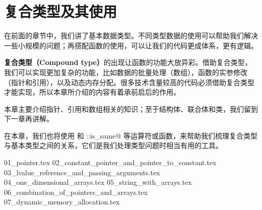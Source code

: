 \chapter{复合类型及其使用}
在前面的章节中，我们讲了基本数据类型。不同类型数据的使用可以帮助我们解决一些小规模的问题；再搭配函数的使用，可以让我们的代码更成体系，更有逻辑。\par
\textbf{复合类型（Compound type）}的出现让函数的功能大放异彩。借助复合类型，我们可以实现更加复杂的功能，比如数据的批量处理（数组），函数的实参修改（指针和引用），以及动态内存分配。很多技术含量较高的代码必须借助复合类型才能实现，所以本章所介绍的内容有着承前启后的作用。\par
本章主要介绍指针、引用和数组相关的知识；至于结构体、联合体和类，我们留到下一章再讲解。\par
在本章，我们也将使用 \lstinline@typeid@ 和 \lstinline@std::is_same@ 等运算符或函数，来帮助我们梳理复合类型与基本类型之间的关系，它们是我们处理类型问题时相当有用的工具。\par
{01_pointer.tex}
{02_constant_pointer_and_pointer_to_constant.tex}
{03_lvalue_reference_and_passing_arguments.tex}
{04_one_dimensional_arrays.tex}
{05_string_with_arrays.tex}
{06_combination_of_pointers_and_arrays.tex}
{07_dynamic_memory_allocation.tex}
